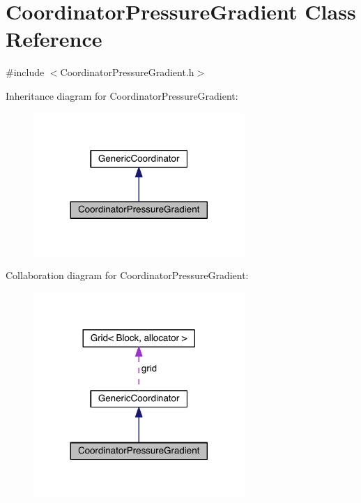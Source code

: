 \hypertarget{class_coordinator_pressure_gradient}{}\section{Coordinator\+Pressure\+Gradient Class Reference}
\label{class_coordinator_pressure_gradient}


{\ttfamily \#include $<$Coordinator\+Pressure\+Gradient.\+h$>$}



Inheritance diagram for Coordinator\+Pressure\+Gradient\+:\nopagebreak
\begin{figure}[H]
\begin{center}
\leavevmode
\includegraphics[width=227pt]{de/d32/class_coordinator_pressure_gradient__inherit__graph}
\end{center}
\end{figure}


Collaboration diagram for Coordinator\+Pressure\+Gradient\+:\nopagebreak
\begin{figure}[H]
\begin{center}
\leavevmode
\includegraphics[width=227pt]{dd/d89/class_coordinator_pressure_gradient__coll__graph}
\end{center}
\end{figure}
